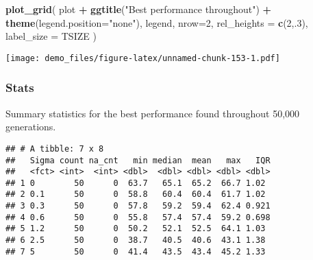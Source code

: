 \documentclass[]{book}
\newenvironment{Shaded}{\begin{snugshade}}{\end{snugshade}}
\newcommand{\DataTypeTok}[1]{\textcolor[rgb]{0.13,0.29,0.53}{#1}}
\newcommand{\DecValTok}[1]{\textcolor[rgb]{0.00,0.00,0.81}{#1}}
\newcommand{\KeywordTok}[1]{\textcolor[rgb]{0.13,0.29,0.53}{\textbf{#1}}}
\newcommand{\NormalTok}[1]{#1}
\newcommand{\OperatorTok}[1]{\textcolor[rgb]{0.81,0.36,0.00}{\textbf{#1}}}
\newcommand{\OtherTok}[1]{\textcolor[rgb]{0.56,0.35,0.01}{#1}}
\newcommand{\StringTok}[1]{\textcolor[rgb]{0.31,0.60,0.02}{#1}}
\begin{document}
\begin{Shaded}
\begin{Highlighting}[]
\KeywordTok{plot_grid}\NormalTok{(}
\NormalTok{  plot }\OperatorTok{+}
\StringTok{    }\KeywordTok{ggtitle}\NormalTok{(}\StringTok{"Best performance throughout"}\NormalTok{) }\OperatorTok{+}
\StringTok{    }\KeywordTok{theme}\NormalTok{(}\DataTypeTok{legend.position=}\StringTok{"none"}\NormalTok{),}
\NormalTok{  legend,}
  \DataTypeTok{nrow=}\DecValTok{2}\NormalTok{,}
  \DataTypeTok{rel_heights =} \KeywordTok{c}\NormalTok{(}\DecValTok{2}\NormalTok{,.}\DecValTok{3}\NormalTok{),}
  \DataTypeTok{label_size =}\NormalTok{ TSIZE}
\NormalTok{)}
\end{Highlighting}
\end{Shaded}

\texttt{[image: demo\_files/figure-latex/unnamed-chunk-153-1.pdf]}

\hypertarget{stats-29}{%
\subsubsection{Stats}\label{stats-29}}

Summary statistics for the best performance found throughout 50,000 generations.

\begin{Shaded}
\end{Shaded}

\begin{verbatim}
## # A tibble: 7 x 8
##   Sigma count na_cnt   min median  mean   max   IQR
##   <fct> <int>  <int> <dbl>  <dbl> <dbl> <dbl> <dbl>
## 1 0        50      0  63.7   65.1  65.2  66.7 1.02 
## 2 0.1      50      0  58.8   60.4  60.4  61.7 1.02 
## 3 0.3      50      0  57.8   59.2  59.4  62.4 0.921
## 4 0.6      50      0  55.8   57.4  57.4  59.2 0.698
## 5 1.2      50      0  50.2   52.1  52.5  64.1 1.03 
## 6 2.5      50      0  38.7   40.5  40.6  43.1 1.38 
## 7 5        50      0  41.4   43.5  43.4  45.2 1.33
\end{verbatim}
\end{document}

